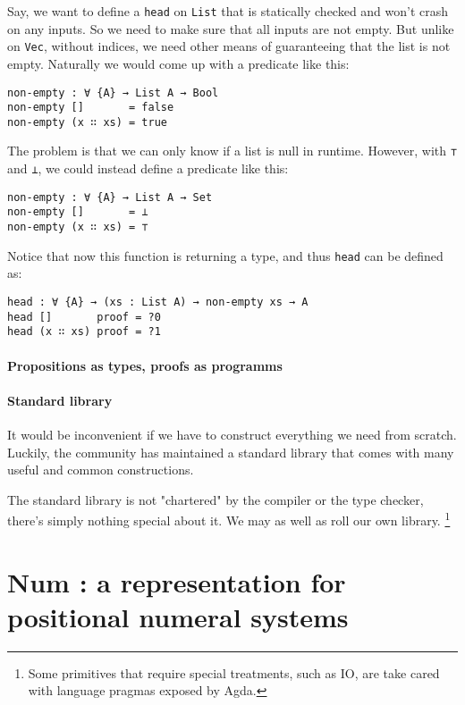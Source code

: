 \documentclass[12pt, a4paper]{article}
\begin{document}
Say, we want to define a {\lstinline|head|} on {\lstinline|List|} that is
statically checked and won't crash on any inputs. So we need to make sure that
all inputs are not empty. But unlike on {\lstinline|Vec|}, without indices, we
need other means of guaranteeing that the list is not empty. Naturally we would
come up with a predicate like this:

\begin{lstlisting}
non-empty : ∀ {A} → List A → Bool
non-empty []       = false
non-empty (x ∷ xs) = true
\end{lstlisting}

The problem is that we can only know if a list is null in runtime. However, with
 {\lstinline|⊤|} and {\lstinline|⊥|}, we could instead define a predicate like this:

\begin{lstlisting}
non-empty : ∀ {A} → List A → Set
non-empty []       = ⊥
non-empty (x ∷ xs) = ⊤
\end{lstlisting}

Notice that now this function is returning a type, and thus {\lstinline|head|} can be
defined as:

\begin{lstlisting}
head : ∀ {A} → (xs : List A) → non-empty xs → A
head []       proof = ?0
head (x ∷ xs) proof = ?1
\end{lstlisting}

\paragraph{Propositions as types, proofs as programms}

\paragraph{Standard library}

It would be inconvenient if we have to construct everything we need from scratch.
Luckily, the community has maintained a standard library that comes with many useful
and common constructions.

The standard library is not "chartered" by the compiler or the type checker,
there's simply nothing special about it. We may as well as roll our own library.
\footnote{Some primitives that require special treatments, such as IO, are take cared with
language pragmas exposed by Agda.}



\section{Num : a representation for positional numeral systems}\label{representation}
\end{document}
